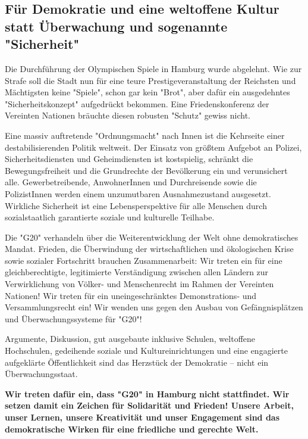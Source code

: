 \documentclass[ngerman,headheight=70pt]{scrartcl}
\begin{document}
    \subsection*{Für Demokratie und eine weltoffene Kultur statt Überwachung und
    sogenannte "Sicherheit"}

    Die Durchführung der Olympischen Spiele in Hamburg wurde abgelehnt. Wie zur
    Strafe soll die Stadt nun für eine teure Prestigeveranstaltung der Reichsten
    und Mächtigsten keine "Spiele", schon gar kein "Brot", aber dafür ein
    ausgedehntes "Sicherheitskonzept" aufgedrückt bekommen. Eine Friedenskonferenz
    der Vereinten Nationen bräuchte diesen robusten "Schutz" gewiss nicht.

    Eine massiv auftretende "Ordnungsmacht" nach Innen ist die Kehrseite einer
    destabilisierenden Politik weltweit. Der Einsatz von größtem Aufgebot an
    Polizei, Sicherheitsdiensten und Geheimdiensten ist kostspielig, schränkt die
    Bewegungsfreiheit und die Grundrechte der Bevölkerung ein und verunsichert
    alle. Gewerbetreibende, AnwohnerInnen und Durchreisende sowie die
    PolizistInnen werden einem unzumutbaren Ausnahmezustand ausgesetzt. Wirkliche
    Sicherheit ist eine Lebensperspektive für alle Menschen durch sozialstaatlich
    garantierte soziale und kulturelle Teilhabe.

    Die "G20" verhandeln über die Weiterentwicklung der Welt ohne demokratisches
    Mandat. Frieden, die Überwindung der wirtschaftlichen und ökologischen Krise
    sowie sozialer Fortschritt brauchen Zusammenarbeit: Wir treten ein für eine
    gleichberechtigte, legitimierte Verständigung zwischen allen Ländern zur
    Verwirklichung von Völker- und Menschenrecht im Rahmen der Vereinten Nationen!
    Wir treten für ein uneingeschränktes Demonstrations- und Versammlungsrecht ein!
    Wir wenden uns gegen den Ausbau von Gefängnisplätzen und Überwachungssysteme
    für "G20"!

    Argumente, Diskussion, gut ausgebaute inklusive Schulen, weltoffene Hochschulen,
    gedeihende soziale und Kultureinrichtungen und eine engagierte aufgeklärte
    Öffentlichkeit sind das Herzstück der Demokratie -- nicht ein Überwachungsstaat.

    \textbf{Wir treten dafür ein, dass "G20" in Hamburg nicht stattfindet.
    Wir setzen damit ein Zeichen für Solidarität und Frieden! Unsere Arbeit,
    unser Lernen, unsere Kreativität und unser Engagement sind das demokratische
    Wirken für eine friedliche und gerechte Welt.}
\end{document}
